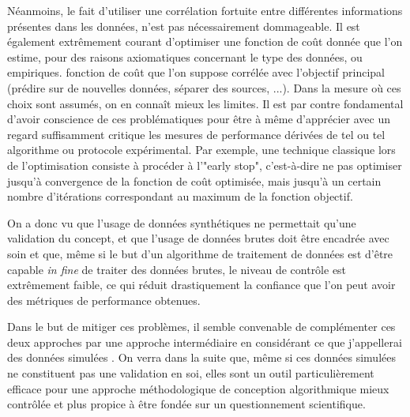   Néanmoins, le fait d'utiliser une corrélation fortuite entre différentes informations présentes dans les données, n'est pas nécessairement dommageable. Il est également extrêmement courant d'optimiser une fonction de coût donnée que l'on estime, pour des raisons axiomatiques concernant le type des données, ou empiriques. fonction de coût que l'on suppose corrélée avec l'objectif principal (prédire sur de nouvelles données, séparer des sources, ...). Dans la mesure où ces choix sont assumés, on en connaît mieux les limites. Il est par contre fondamental d'avoir conscience de ces problématiques pour être à même d'apprécier avec un regard suffisamment critique les mesures de performance dérivées de tel ou tel algorithme ou protocole expérimental\cite{lagrangehal-01635373}. Par exemple, une technique classique lors de l'optimisation consiste à procéder à l'"early stop", c'est-à-dire ne pas optimiser jusqu'à convergence de la fonction de coût optimisée, mais jusqu'à un certain nombre d'itérations correspondant au maximum de la fonction objectif.

  On a donc vu que l'usage de données synthétiques ne permettait qu'une validation du concept, et que l'usage de données brutes doit être encadrée avec soin et que, même si le but d'un algorithme de traitement de données est d'être capable \textit{in fine} de traiter des données brutes, le niveau de contrôle est extrêmement faible, ce qui réduit drastiquement la confiance que l'on peut avoir des métriques de performance obtenues.

  Dans le but de mitiger ces problèmes, il semble convenable de complémenter ces deux approches par une approche intermédiaire en considérant ce que j'appellerai des données \og simulées \fg. On verra dans la suite que, même si ces données simulées ne constituent pas une validation en soi, elles sont un outil particulièrement efficace pour une approche méthodologique de conception algorithmique mieux contrôlée et plus propice à être fondée sur un questionnement scientifique.

